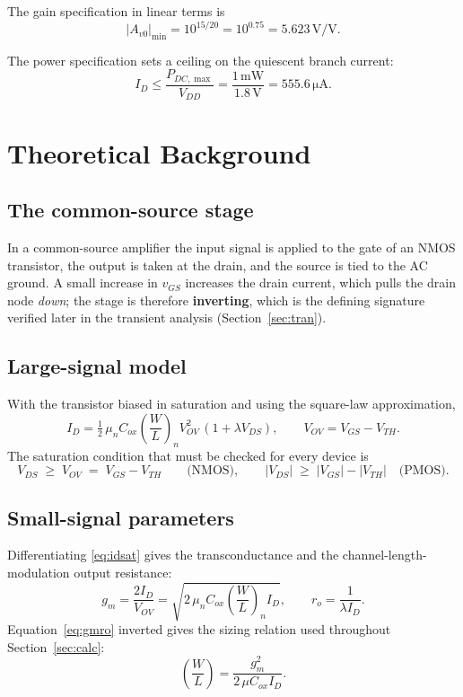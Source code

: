 \documentclass[12pt,a4paper]{article}
\newcommand{\U}[1]{\,\mathrm{#1}}
\newcommand{\WL}{\left(\dfrac{W}{L}\right)}
\begin{document}
The gain specification in linear terms is
\begin{equation}
|A_{v0}|_{\min} = 10^{15/20} = 10^{0.75} = 5.623\U{V/V}.
\label{eq:gainspec}
\end{equation}

The power specification sets a ceiling on the quiescent branch current:
\begin{equation}
I_D \leq \frac{P_{DC,\max}}{V_{DD}} = \frac{1\U{mW}}{1.8\U{V}} = 555.6\U{\mu A}.
\label{eq:idmax}
\end{equation}

\section{Theoretical Background}

\subsection{The common-source stage}
In a common-source amplifier the input signal is applied to the gate of an NMOS
transistor, the output is taken at the drain, and the source is tied to the AC
ground. A small increase in $v_{GS}$ increases the drain current, which pulls
the drain node \emph{down}; the stage is therefore \textbf{inverting}, which is
the defining signature verified later in the transient analysis
(Section~\ref{sec:tran}).

\subsection{Large-signal model}
With the transistor biased in saturation and using the square-law
approximation,
\begin{equation}
I_D = \tfrac{1}{2}\,\mu_n C_{ox}\WL_n V_{OV}^{2}\,(1+\lambda V_{DS}),
\qquad V_{OV} = V_{GS}-V_{TH}.
\label{eq:idsat}
\end{equation}
The saturation condition that must be checked for every device is
\begin{equation}
V_{DS} \;\geq\; V_{OV} \;=\; V_{GS}-V_{TH}
\qquad\text{(NMOS)},\qquad
|V_{DS}| \;\geq\; |V_{GS}|-|V_{TH}|
\quad\text{(PMOS)}.
\label{eq:satcond}
\end{equation}

\subsection{Small-signal parameters}
Differentiating \eqref{eq:idsat} gives the transconductance and the
channel-length-modulation output resistance:
\begin{equation}
g_m = \frac{2 I_D}{V_{OV}} = \sqrt{2\,\mu_n C_{ox}\WL_n I_D},
\qquad
r_o = \frac{1}{\lambda I_D}.
\label{eq:gmro}
\end{equation}
Equation~\eqref{eq:gmro} inverted gives the sizing relation used throughout
Section~\ref{sec:calc}:
\begin{equation}
\WL = \frac{g_m^{2}}{2\,\mu C_{ox} I_D}.
\label{eq:sizing}
\end{equation}
\end{document}
